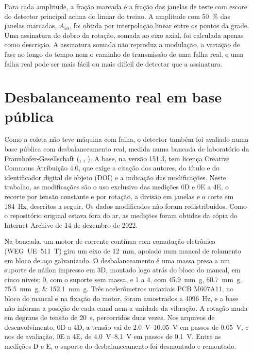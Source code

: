 Para cada amplitude, a fração marcada é a fração das janelas de teste com escore do detector principal acima do limiar do treino. A amplitude com \SI{50}{\percent} das janelas marcadas, $A_{50}$, foi obtida por interpolação linear entre os pontos da grade. Uma assinatura do dobro da rotação, somada ao eixo axial, foi calculada apenas como descrição. A assinatura somada não reproduz a modulação, a variação de fase ao longo do tempo nem o caminho de transmissão de uma falha real, e uma falha real pode ser mais fácil ou mais difícil de detectar que a assinatura.

\section{Desbalanceamento real em base pública}\label{sec:base-publica}

Como a coleta não teve máquina com falha, o detector também foi avaliado numa base pública com desbalanceamento real, medida numa bancada de laboratório da Fraunhofer-Gesellschaft (, \citeyear{mey2020}, \citeyear{mey2022dados}). A base, na versão 151.3, tem licença Creative Commons Atribuição 4.0, que exige a citação dos autores, do título e do identificador digital de objeto (DOI) e a indicação das modificações. Neste trabalho, as modificações são o uso exclusivo das medições 0D e 0E a 4E, o recorte por tensão constante e por rotação, a divisão em janelas e o corte em \SI{184}{\hertz}, descritos a seguir. Os dados modificados não foram redistribuídos. Como o repositório original estava fora do ar, as medições foram obtidas da cópia do Internet Archive de 14 de dezembro de 2022.

Na bancada, um motor de corrente contínua com comutação eletrônica (WEG~UE~511~T) gira um eixo de \SI{12}{\milli\meter}, apoiado num mancal de rolamento em bloco de aço galvanizado. O desbalanceamento é uma massa presa a um suporte de náilon impresso em 3D, montado logo atrás do bloco do mancal, em cinco níveis: 0, com o suporte sem massa, e 1 a 4, com \SIlist{45,9;60,7;75,5;152,1}{\milli\meter\gram}. Três acelerômetros uniaxiais PCB M607A11, no bloco do mancal e na fixação do motor, foram amostrados a \SI{4096}{\hertz}, e a base não informa a posição de cada canal nem a unidade da vibração. A rotação muda em degraus de tensão de \SI{20}{\second}, percorridos duas vezes. Nos arquivos de desenvolvimento, 0D a 4D, a tensão vai de \SIrange{2,0}{10,05}{\volt} em passos de \SI{0,05}{\volt}, e nos de avaliação, 0E a 4E, de \SIrange{4,0}{8,1}{\volt} em passos de \SI{0,1}{\volt}. Entre as medições D e E, o suporte do desbalanceamento foi desmontado e remontado.

